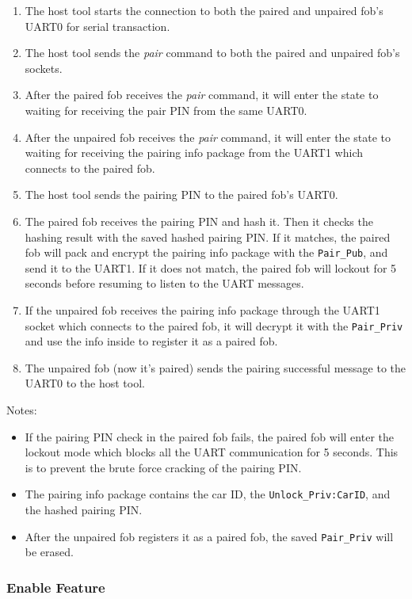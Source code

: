 \documentclass[11pt,oneside,onecolumn,letterpaper]{article}
\begin{document}
\begin{enumerate}
	\item The host tool starts the connection to both the paired and unpaired fob's UART0 for serial transaction.
	\item The host tool sends the \textit{pair} command to both the paired and unpaired fob's sockets.
	\item After the paired fob receives the \textit{pair} command, it will enter the state to waiting for receiving the pair PIN from the same UART0.
	\item After the unpaired fob receives the \textit{pair} command, it will enter the state to waiting for receiving the pairing info package from the UART1 which connects to the paired fob.
	\item The host tool sends the pairing PIN to the paired fob's UART0.
	\item The paired fob receives the pairing PIN and hash it. Then it checks the hashing result with the saved hashed pairing PIN. If it matches, the paired fob will pack and encrypt the pairing info package with the \verb|Pair_Pub|, and send it to the UART1. If it does not match, the paired fob will lockout for 5 seconds before resuming to listen to the UART messages.
	\item If the unpaired fob receives the pairing info package through the UART1 socket which connects to the paired fob, it will decrypt it with the \verb|Pair_Priv| and use the info inside to register it as a paired fob.
	\item The unpaired fob (now it's paired) sends the pairing successful message to the UART0 to the host tool.
\end{enumerate}

Notes:
\begin{itemize}
	\item If the pairing PIN check in the paired fob fails, the paired fob will enter the lockout mode which blocks all the UART communication for 5 seconds. This is to prevent the brute force cracking of the pairing PIN.
	\item The pairing info package contains the car ID, the \verb|Unlock_Priv:CarID|, and the hashed pairing PIN.
	\item After the unpaired fob registers it as a paired fob, the saved \verb|Pair_Priv| will be erased.
\end{itemize}

\subsubsection{Enable Feature}
\end{document}
